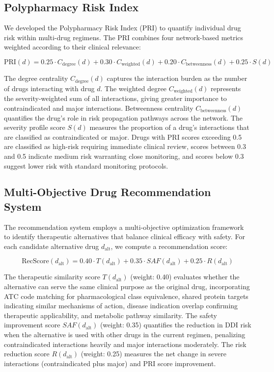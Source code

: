\documentclass[11pt,a4paper]{article}
\begin{document}
\subsection*{Polypharmacy Risk Index}

We developed the Polypharmacy Risk Index (PRI) to quantify individual drug risk within multi-drug regimens. The PRI combines four network-based metrics weighted according to their clinical relevance:

\begin{equation}
\text{PRI}(d) = 0.25 \cdot C_{\text{degree}}(d) + 0.30 \cdot C_{\text{weighted}}(d) + 0.20 \cdot C_{\text{betweenness}}(d) + 0.25 \cdot S(d)
\end{equation}

The degree centrality $C_{\text{degree}}(d)$ captures the interaction burden as the number of drugs interacting with drug $d$. The weighted degree $C_{\text{weighted}}(d)$ represents the severity-weighted sum of all interactions, giving greater importance to contraindicated and major interactions. Betweenness centrality $C_{\text{betweenness}}(d)$ quantifies the drug's role in risk propagation pathways across the network. The severity profile score $S(d)$ measures the proportion of a drug's interactions that are classified as contraindicated or major. Drugs with PRI scores exceeding 0.5 are classified as high-risk requiring immediate clinical review, scores between 0.3 and 0.5 indicate medium risk warranting close monitoring, and scores below 0.3 suggest lower risk with standard monitoring protocols.

\subsection*{Multi-Objective Drug Recommendation System}

The recommendation system employs a multi-objective optimization framework to identify therapeutic alternatives that balance clinical efficacy with safety. For each candidate alternative drug $d_{\text{alt}}$, we compute a recommendation score:

\begin{equation}
\text{RecScore}(d_{\text{alt}}) = 0.40 \cdot T(d_{\text{alt}}) + 0.35 \cdot SAF(d_{\text{alt}}) + 0.25 \cdot R(d_{\text{alt}})
\end{equation}

The therapeutic similarity score $T(d_{\text{alt}})$ (weight: 0.40) evaluates whether the alternative can serve the same clinical purpose as the original drug, incorporating ATC code matching for pharmacological class equivalence, shared protein targets indicating similar mechanisms of action, disease indication overlap confirming therapeutic applicability, and metabolic pathway similarity. The safety improvement score $SAF(d_{\text{alt}})$ (weight: 0.35) quantifies the reduction in DDI risk when the alternative is used with other drugs in the current regimen, penalizing contraindicated interactions heavily and major interactions moderately. The risk reduction score $R(d_{\text{alt}})$ (weight: 0.25) measures the net change in severe interactions (contraindicated plus major) and PRI score improvement.
\end{document}
